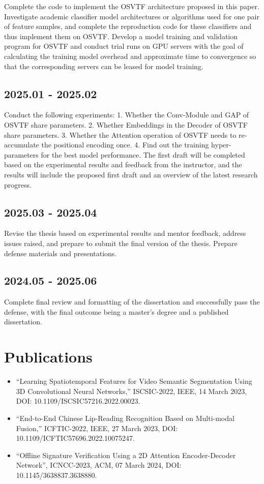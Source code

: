 \documentclass{article}
\begin{document}
Complete the code to implement the OSVTF architecture proposed in this paper. Investigate academic classifier model architectures or algorithms used for one pair of feature samples, and complete the reproduction code for these classifiers and thus implement them on OSVTF. Develop a model training and validation program for OSVTF and conduct trial runs on GPU servers with the goal of calculating the training model overhead and approximate time to convergence so that the corresponding servers can be leased for model training.

\subsection*{2025.01 - 2025.02}

Conduct the following experiments: 1. Whether the Conv-Module and GAP of OSVTF share parameters. 2. Whether Embeddings in the Decoder of OSVTF share parameters. 3. Whether the Attention operation of OSVTF needs to re-accumulate the positional encoding once. 4. Find out the training hyper-parameters for the best model performance. The first draft will be completed based on the experimental results and feedback from the instructor, and the results will include the proposed first draft and an overview of the latest research progress.

\subsection*{2025.03 - 2025.04}

Revise the thesis based on experimental results and mentor feedback, address issues raised, and prepare to submit the final version of the thesis. Prepare defense materials and presentations.

\subsection*{2024.05 - 2025.06}

Complete final review and formatting of the dissertation and successfully pass the defense, with the final outcome being a master's degree and a published dissertation.

\newpage
\section{Publications}

\begin{itemize}
	\item ``Learning Spatiotemporal Features for Video Semantic Segmentation Using 3D Convolutional Neural Networks,''
	      ISCSIC-2022, IEEE, 14 March 2023, DOI: 10.1109/ISCSIC57216.2022.00023.
	\item ``End-to-End Chinese Lip-Reading Recognition Based on Multi-modal Fusion,'' ICFTIC-2022, IEEE, 27 March 2023, DOI: 10.1109/ICFTIC57696.2022.10075247.
	\item ``Offline Signature Verification Using a 2D Attention Encoder-Decoder Network'', ICNCC-2023, ACM, 07 March 2024, DOI: 10.1145/3638837.3638880.
\end{itemize}
\end{document}
